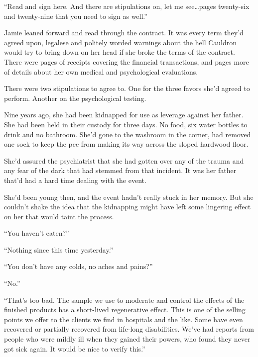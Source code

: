 ``Read and sign here.  And there are stipulations on, let me see\ldots pages twenty-six and twenty-nine that you need to sign as well.''



Jamie leaned forward and read through the contract.  It was every term they'd agreed upon, legalese and politely worded warnings about the hell Cauldron would try to bring down on her head if she broke the terms of the contract.  There were pages of receipts covering the financial transactions, and pages more of details about her own medical and psychological evaluations.



There were two stipulations to agree to.  One for the three favors she'd agreed to perform.  Another on the psychological testing.



Nine years ago, she had been kidnapped for use as leverage against her father.  She had been held in their custody for three days.  No food, six water bottles to drink and no bathroom.  She'd gone to the washroom in the corner, had removed one sock to keep the pee from making its way across the sloped hardwood floor.



She'd assured the psychiatrist that she had gotten over any of the trauma and any fear of the dark that had stemmed from that incident.  It was her father that'd had a hard time dealing with the event.



She'd been young then, and the event hadn't really stuck in her memory.  But she couldn't shake the idea that the kidnapping might have left some lingering effect on her that would taint the process.



``You haven't eaten?''



``Nothing since this time yesterday.''



``You don't have any colds, no aches and pains?''



``No.''



``That's too bad.  The sample we use to moderate and control the effects of the finished products has a short-lived regenerative effect.  This is one of the selling points we offer to the clients we find in hospitals and the like.  Some have even recovered or partially recovered from life-long disabilities.  We've had reports from people who were mildly ill when they gained their powers, who found they never got sick again.  It would be nice to verify this.''



